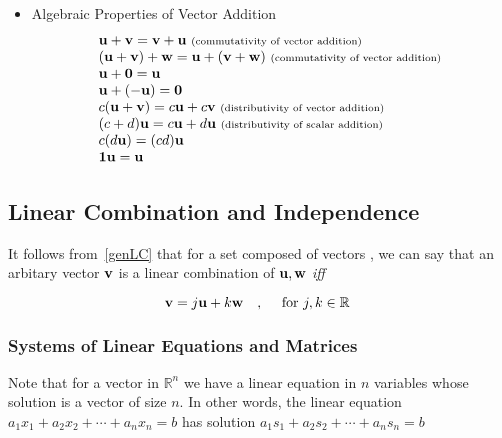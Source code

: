 \documentclass[english,course]{Notes}
\newcommand{\real}{\mathbb{R}}
\newcommand{\ita}[1]{\textit{#1}}
\begin{document}
\begin{itemize}
	\item []Algebraic Properties of Vector Addition
	      $$\begin{array}{l}{\mathbf{u}+\mathbf{v}=\mathbf{v}+\mathbf{u} \text { \scriptsize (commutativity of vector addition) }} \\ {(\mathbf{u}+\mathbf{v})+\mathbf{w}=\mathbf{u}+(\mathbf{v}+\mathbf{w}) \text { \scriptsize(commutativity of vector addition) }} \\ {\mathbf{u}+\mathbf{0}=\mathbf{u}} \\ {\mathbf{u}+(-\mathbf{u})=\mathbf{0}} \\ {c(\mathbf{u}+\mathbf{v})=c \mathbf{u}+c \mathbf{v} \text { \scriptsize(distributivity of vector addition) }} \\ {(c+d) \mathbf{u}=c \mathbf{u}+d \mathbf{u} \text { \scriptsize(distributivity of scalar addition) }} \\ {c(d \mathbf{u})=(c d) \mathbf{u}} \\ {\mathbf{1} \mathbf{u}=\mathbf{u}}\end{array}
	      $$\end{itemize}
	      
	      \subsection{Linear Combination and Independence}
	      
	      
	      \par{It follows from~\ref{genLC} that for a set composed of vectors , we can say that an arbitary vector $\mathbf{v}$ is a linear combination of $\mathbf{u} , \mathbf{w}$ \ita{iff}}
	      
	      $$ \vc{v} = j\vc{u} + k\vc{w} \quad , \quad \text{ for } j, k \in \real~\label{lc}$$
	      
	      \subsubsection{Systems of Linear Equations and Matrices}
	      
	      \par{Note that for a vector in $\real^{n}$ we have a linear equation in $n$ variables whose solution is  a vector of size $n$. In other words, the linear equation $a_{1} x_{1}+a_{2} x_{2}+\cdots + a_{n} x_{n}=b$ has solution $a_{1} s_{1}+a_{2} s_{2}+\cdots +a_{n} s_{n}=b$}
	      
\end{document}
